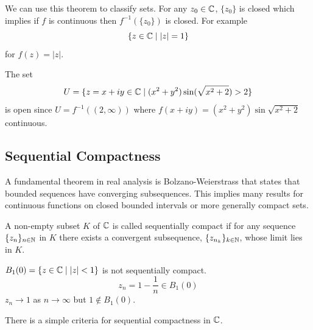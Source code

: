 \documentclass[10pt, a4paper]{article}
\begin{document}
We can use this theorem to classify sets.
For any $z_0 \in \mathbb{C}$,
$\{z_0\}$ is closed which implies if $f$ is continuous then $f ^ {-1}(\{z_0\})$ is closed.
For example
\[
\{z \in \mathbb{C} \mid |z| = 1\}
\]
for $f(z) = |z|$.

The set
\[
U = \{z = x + iy \in \mathbb{C} \mid (x ^ 2 + y ^ 2)\sin(\sqrt{x ^ 2 + 2}) > 2\}
\]
is open since $U = f ^ {-1}((2, \infty))$ where $f(x + iy) = (x ^ 2 + y ^ 2)\sin\sqrt{x ^ 2 + 2}$ continuous.

\subsection{Sequential Compactness}
A fundamental theorem in real analysis is Bolzano-Weierstrass that states that bounded sequences have converging subsequences.
This implies many results for continuous functions on closed bounded intervals or more generally compact sets.

\begin{definition}
    A non-empty subset $K$ of $\mathbb{C}$ is called sequentially compact if for any sequence $\{z_n\}_{n \in \mathbb{N}}$ in $K$ there exists a convergent subsequence,
    $\{z_{n_k}\}_{k \in \mathbb{N}}$,
    whose limit lies in $K$.
\end{definition}

\begin{example}
    $B_1(0) = \{z \in \mathbb{C} \mid |z| < 1\}$ is not sequentially compact.
    \[
    z_n = 1 - \frac{1}{n} \in B_1(0)
    \]
    $z_n \to 1$ as $n \to \infty$ but $1 \notin B_1(0)$.
\end{example}

There is a simple criteria for sequential compactness in $\mathbb{C}$.
\end{document}
